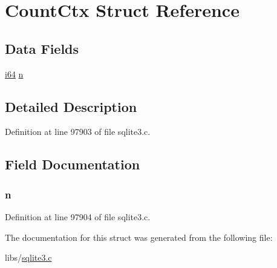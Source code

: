 \hypertarget{struct_count_ctx}{}\section{Count\+Ctx Struct Reference}
\label{struct_count_ctx}
\subsection*{Data Fields}
\begin{DoxyCompactItemize}
\item 
\hyperlink{sqlite3_8c_a2a0f0f4ae7001eb54351f77ea1cdbcfd}{i64} \hyperlink{struct_count_ctx_a62842a17620adad5ef0d620a86af7875}{n}
\end{DoxyCompactItemize}


\subsection{Detailed Description}


Definition at line 97903 of file sqlite3.\+c.



\subsection{Field Documentation}
\hypertarget{struct_count_ctx_a62842a17620adad5ef0d620a86af7875}{}
\subsubsection[{n}]{ n}\label{struct_count_ctx_a62842a17620adad5ef0d620a86af7875}


Definition at line 97904 of file sqlite3.\+c.



The documentation for this struct was generated from the following file\+:\begin{DoxyCompactItemize}
\item 
libs/\hyperlink{sqlite3_8c}{sqlite3.\+c}\end{DoxyCompactItemize}
